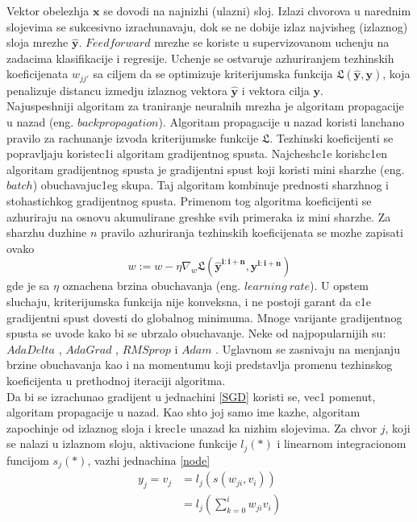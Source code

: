 \documentclass[a4paper, openany, oneside, 11pt]{book}
\begin{document}
Vektor obelezhja $\mathbf{x}$ se dovodi na najnizhi (ulazni) sloj. Izlazi chvorova u narednim slojevima se sukcesivno izrachunavaju, dok se ne dobije izlaz najvisheg (izlaznog) sloja mrezhe $\mathbf{\hat{y}}$. $Feedforward$ mrezhe se koriste u supervizovanom uchenju na zadacima klasifikacije i regresije. Uchenje se ostvaruje azhuriranjem tezhinskih koeficijenata $w_{jj'}$ sa ciljem da se optimizuje kriterijumska funkcija $\mathfrak{L}(\mathbf{\hat{y}}, \mathbf{y})$, koja penalizuje distancu izmedju izlaznog vektora $\mathbf{\hat{y}}$ i vektora cilja $\mathbf{y}$.\\
Najuspeshniji algoritam za traniranje neuralnih mrezha je algoritam propagacije u nazad (eng. $backpropagation$)\cite{Backprog}. Algoritam propagacije u nazad koristi lanchano pravilo za rachunanje izvoda kriterijumske funkcije $\mathfrak{L}$. Tezhinski koeficijenti se popravljaju koristec1i algoritam gradijentnog spusta. Najchesh\-c1e korish\-c1en algoritam gradijentnog spusta je gradijentni spust koji koristi mini sharzhe (eng. $batch$) obuchavajuc1eg skupa. Taj algoritam kombinuje prednosti sharzhnog i stohastichkog gradijentnog spusta. Primenom tog algoritma koeficijenti se azhuriraju na osnovu akumulirane greshke svih primeraka iz mini sharzhe. Za sharzhu duzhine $n$ pravilo azhuriranja tezhinskih koeficijenata se mozhe zapisati ovako
\begin{equation}\label{SGD}
w := w- \eta\nabla_w\mathfrak{L}\left(\mathbf{\hat{y}^{i:i+n}}, \mathbf{y^{i:i+n}}\right)
\end{equation}
gde je sa $\eta$ oznachena brzina obuchavanja (eng. $learning\ rate$).
U opstem sluchaju, kriterijumska funkcija nije konveksna, i ne postoji garant da c1e gradijentni spust dovesti do globalnog minimuma. Mnoge varijante gradijentnog spusta se uvode kako bi se ubrzalo obuchavanje. Neke od najpopularnijih su: $AdaDelta$ \cite{AdaDelta}, $AdaGrad$ \cite{AdaGrad}, $RMSprop$ \cite{RMSprop} i $Adam$ \cite{Adam}. Uglavnom se zasnivaju na menjanju brzine obu\-chavanja kao i na momentumu koji predstavlja promenu tezhinskog koeficijenta u prethodnoj iteraciji algoritma.\\
Da bi se izrachunao gradijent u jednachini \ref{SGD} koristi se, vec1 pomenut, algoritam propagacije u nazad. Kao shto joj samo ime kazhe, algoritam zapochinje od izlaznog sloja i krec1e unazad ka nizhim slojevima. 
Za chvor $j$, koji se nalazi u izlaznom sloju, aktivacione funkcije $l_j(*)$ i linearnom integracionom funcijom $s_j(*)$, vazhi jednachina \ref{node}
\begin{align}
y_j=v_j &= l_j\left(s(w_{ji},v_i)\right)\\
&=l_j\left(\sum^{i}_{k=0}w_{ji}v_i\right)
\end{align}
\end{document}

